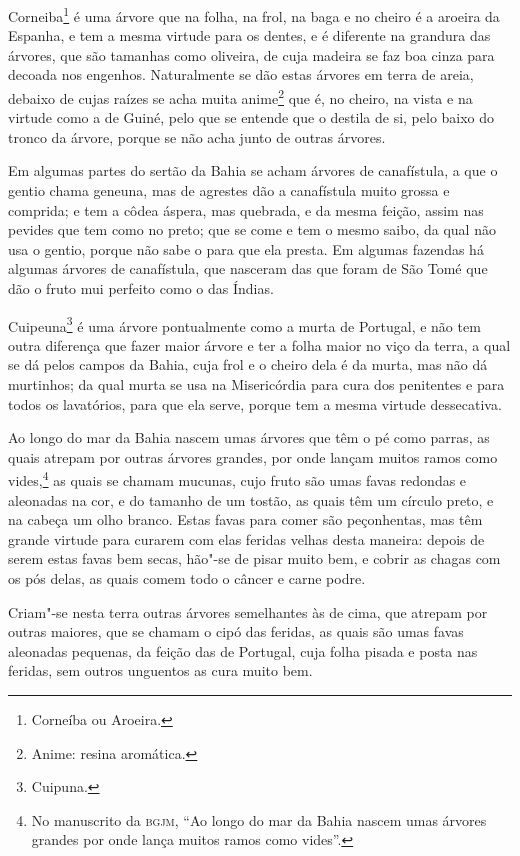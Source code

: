 \begin{linenumbers}
Corneiba\footnote{ Corneíba ou Aroeira.} é uma árvore que na folha, na frol, na baga e no
cheiro é a aroeira da Espanha, e tem a mesma virtude para os dentes, e é diferente na
grandura das árvores, que são tamanhas como oliveira, de cuja madeira se faz boa cinza
para decoada nos engenhos. Naturalmente se dão estas árvores em terra de areia, debaixo de
cujas raízes se acha muita anime\footnote{ Anime: resina aromática.} que é, no cheiro, na
vista e na virtude como a de Guiné, pelo que se entende que o destila de si, pelo baixo do
tronco da árvore, porque se não acha junto de outras árvores.

Em algumas partes do sertão da Bahia se acham árvores de canafístula, a que o gentio chama
geneuna, mas de agrestes dão a canafístula muito grossa e comprida; e tem a côdea áspera,
mas quebrada, e da mesma feição, assim nas pevides que tem como no preto; que se come e
tem o mesmo saibo, da qual não usa o gentio, porque não sabe o para que ela presta. Em
algumas fazendas há algumas árvores de canafístula, que nasceram das que foram de São Tomé
que dão o fruto mui perfeito como o das Índias.

Cuipeuna\footnote{ Cuipuna.} é uma árvore pontualmente como a murta de Portugal, e não tem
outra diferença que fazer maior árvore e ter a folha maior no viço da terra, a qual se dá
pelos campos da Bahia, cuja frol e o cheiro dela é da murta, mas não dá murtinhos; da qual
murta se usa na Misericórdia para cura dos penitentes e para todos os lavatórios, para que
ela serve, porque tem a mesma virtude dessecativa.

Ao longo do mar da Bahia nascem umas árvores que têm o pé como parras, as quais atrepam
por outras árvores grandes, por onde lançam muitos ramos como vides,\footnote{ No
manuscrito da \textsc{bgjm}, ``Ao longo do mar da Bahia nascem umas árvores grandes por
onde lança muitos ramos como vides''.} as quais se chamam mucunas, cujo fruto são umas
favas redondas e aleonadas na cor, e do tamanho de um tostão, as quais têm um círculo
preto, e na cabeça um olho branco. Estas favas para comer são peçonhentas, mas têm grande
virtude para curarem com elas feridas velhas desta maneira: depois de serem estas favas
bem secas, hão"-se de pisar muito bem, e cobrir as chagas com os pós delas, as quais comem
todo o câncer e carne podre.

Criam"-se nesta terra outras árvores semelhantes às de cima, que atrepam por outras
maiores, que se chamam o cipó das feridas, as quais são umas favas aleonadas pequenas, da
feição das de Portugal, cuja folha pisada e posta nas feridas, sem outros unguentos as
cura muito bem.


\end{linenumbers}
